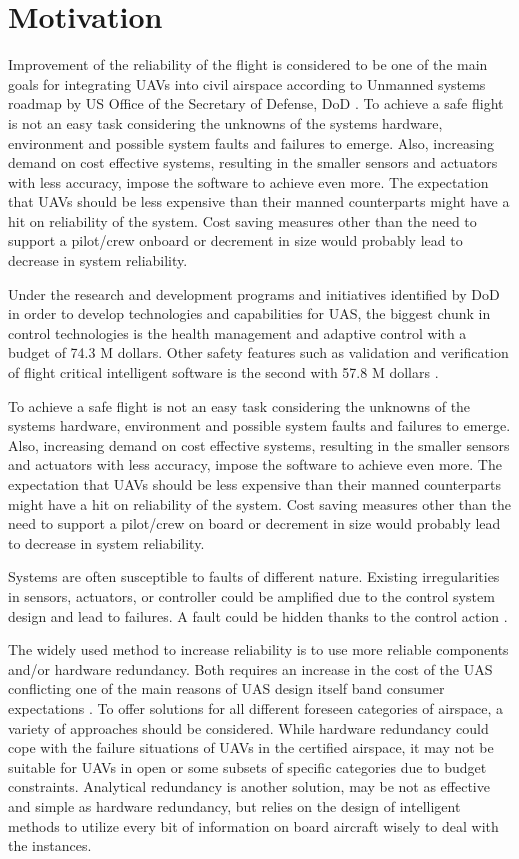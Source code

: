 \section{Motivation}

Improvement of the reliability of the flight is considered to be one of the main goals for integrating UAVs into civil airspace according to Unmanned systems roadmap by US Office of the Secretary of Defense, DoD \cite{UnmannedSystemsRoadmapDoD}. 
To achieve a safe flight is not an easy task considering the unknowns of the systems hardware, environment and possible system faults and failures to emerge. 
Also, increasing demand on cost effective systems, resulting in the smaller sensors and actuators with less accuracy, impose the software to achieve even more. 
The expectation that UAVs should be less expensive than their manned counterparts might have a hit on reliability of the system. Cost saving measures other than the need to support a pilot/crew onboard or decrement in size would probably lead to decrease in system reliability.

Under the research and development programs and initiatives identified by DoD in order to develop technologies and capabilities for UAS, the biggest chunk in control technologies is the health management and adaptive control with a budget of 74.3 M dollars. 
Other safety features such as validation and verification of flight critical intelligent software is the second with 57.8 M dollars \cite{UnmannedSystemsRoadmapDoD}. 

To achieve a safe flight is not an easy task considering the unknowns of the systems hardware, environment and possible system faults and failures to emerge. Also, increasing demand on cost effective systems, resulting in the smaller sensors and actuators with less accuracy, impose the software to achieve even more. The expectation that UAVs should be less expensive than their manned counterparts might have a hit on reliability of the system. Cost saving measures other than the need to support a pilot/crew on board or decrement in size would probably lead to decrease in system reliability.

Systems are often susceptible to faults of different nature. Existing irregularities in sensors, actuators, or controller could be amplified due to the control system design and lead to failures. A fault could be hidden thanks to the control action \cite{ducard2009fault}.

The widely used method to increase reliability is to use more reliable components and/or hardware redundancy. Both requires an increase in the cost of the UAS conflicting one of the main reasons of UAS design itself band consumer expectations \cite{angelov2012sense}. To offer solutions for all different foreseen categories of airspace, a variety of approaches should be considered. While hardware redundancy could cope with the failure situations of UAVs in the certified airspace, it may not be suitable for UAVs in open or some subsets of specific categories due to budget constraints. Analytical redundancy is another solution, may be not as effective and simple as hardware redundancy, but relies on the design of intelligent methods to utilize every bit of information on board aircraft wisely to deal with the instances.  

